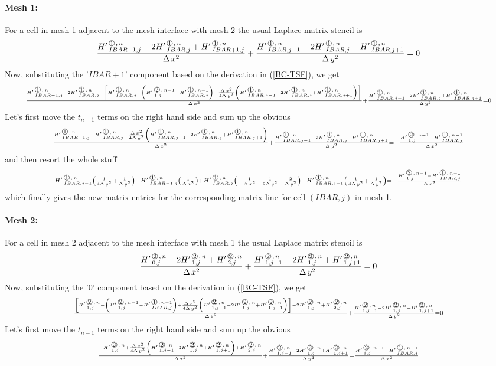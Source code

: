 \paragraph{Mesh 1:} For a cell in mesh 1 adjacent to the mesh interface with mesh 2 the usual Laplace matrix stencil is
\[   \frac{ \HL{IBAR-1,j}{1}{n} -2 \HL{IBAR,j}{1}{n} + \HL{IBAR+1,j}{1}{n} }{\DXT} +  
    \frac{ \HL{IBAR,j-1}{1}{n} -2 \HL{IBAR,j}{1}{n} + \HL{IBAR,j+1}{1}{n} }{\DYT} = 0 \]
Now, substituting the '$IBAR+1$' component based on the derivation in (\ref{BC-TSF}), we get 
\[ {\scriptstyle  \frac{ \HL{IBAR-1,j}{1}{n} -2 \HL{IBAR,j}{1}{n} 
+ \left[ \HL{IBAR,j}{1}{n}  + \left(\HL{1,j}{2}{n-1} - \HL{IBAR,j}{1}{n-1}\right) + \frac{\DXT}{4\DYT}   \left(\HL{IBAR,j-1}{1}{n} - 2 \HL{IBAR,j}{1}{n} + \HL{IBAR,j+1}{1}{n} \right) \right]}{\DXT}
+      \frac{ \HL{IBAR,j-1}{1}{n} -2 \HL{IBAR,j}{1}{n} + \HL{IBAR,j+1}{1}{n} }{\DYT} = 0}
\]
Let's first move the $t_{n-1}$ terms on the right hand side and sum up the obvious
\[ {\scriptstyle  \frac{ \HL{IBAR-1,j}{1}{n} - \HL{IBAR,j}{1}{n}   
+ \frac{\DXT}{4\DYT}   \left(\HL{IBAR,j-1}{1}{n} - 2 \HL{IBAR,j}{1}{n} + \HL{IBAR,j+1}{1}{n} \right) }{\DXT}
+      \frac{ \HL{IBAR,j-1}{1}{n} -2 \HL{IBAR,j}{1}{n} + \HL{IBAR,j+1}{1}{n} }{\DYT} = -\frac{\HL{1,j}{2}{n-1} - \HL{IBAR,j}{1}{n-1}}{\DXT} }
\]
and then resort the whole stuff
\[ {\scriptstyle 
      \HL{IBAR,j-1}{1}{n} \left( \frac {1}{4\DYT} + \frac {1}{\DYT}    \right)
 +   \HL{IBAR-1,j}{1}{n} \left( \frac {1}{\DXT} \right)
 +   \HL{IBAR,j}{1}{n} \left( -\frac {1}{\DXT} - \frac {1}{2\DYT} - \frac {2}{\DYT}    \right)
 +   \HL{IBAR,j+1}{1}{n} \left( \frac {1}{4\DYT}   + \frac {1}{\DYT}    \right)
    = -\frac{\HL{1,j}{2}{n-1} - \HL{IBAR,j}{1}{n-1}}{\DXT} }
\]
which finally gives the new matrix entries for the corresponding matrix line for cell $(IBAR,j)$ in mesh 1. 

\paragraph{Mesh 2:} For a cell in mesh 2 adjacent to the mesh interface with mesh 1 the usual Laplace matrix stencil is
\[   
   \frac{ \HL{0,j}{2}{n} -2 \HL{1,j}{2}{n} + \HL{2,j}{2}{n} }{\DXT} +  
   \frac{ \HL{1,j-1}{2}{n} -2 \HL{1,j}{2}{n} + \HL{1,j+1}{2}{n} }{\DYT} = 0 
\]
Now, substituting the '$0$' component based on the derivation in (\ref{BC-TSF}), we get 
\[ 
  {\scriptstyle  
   \frac{ 
   \left[
         \HL{1,j}{2}{n}  - \left( \HL{1,j}{2}{n-1} - \HL{IBAR,j}{1}{n-1}\right)
      + \frac{\DXT}{4\DYT}   \left(\HL{1,j-1}{2}{n} - 2 \HL{1,j}{2}{n} + \HL{1,j+1}{2}{n}\right)
   \right] 
   -2 \HL{1,j}{2}{n} + \HL{2,j}{2}{n} }{\DXT} +  
   \frac{ \HL{1,j-1}{2}{n} -2 \HL{1,j}{2}{n} + \HL{1,j+1}{2}{n} }{\DYT} = 0 
   }
\]
Let's first move the $t_{n-1}$ terms on the right hand side and sum up the obvious
\[ 
  {\scriptstyle  
   \frac{ 
         -\HL{1,j}{2}{n}  
      + \frac{\DXT}{4\DYT}   \left(\HL{1,j-1}{2}{n} - 2 \HL{1,j}{2}{n} + \HL{1,j+1}{2}{n}\right)
 + \HL{2,j}{2}{n} }{\DXT} +  
   \frac{ \HL{1,j-1}{2}{n} -2 \HL{1,j}{2}{n} + \HL{1,j+1}{2}{n} }{\DYT} =  \frac{\HL{1,j}{2}{n-1} - \HL{IBAR,j}{1}{n-1}}{\DXT}
   }
\]



